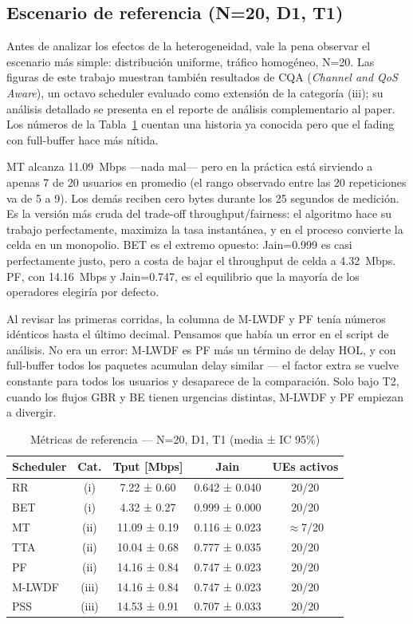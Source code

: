 \documentclass[conference]{IEEEtran}
\begin{document}
\subsection{Escenario de referencia (N=20, D1, T1)}

Antes de analizar los efectos de la heterogeneidad, vale la pena observar el escenario
más simple: distribución uniforme, tráfico homogéneo, N=20. Las figuras de este trabajo
muestran también resultados de CQA (\emph{Channel and QoS Aware}), un octavo scheduler
evaluado como extensión de la categoría (iii); su análisis detallado se presenta en el
reporte de análisis complementario al paper. Los números de la
Tabla~\ref{tab:referencia} cuentan una historia ya conocida pero que el fading con
full-buffer hace más nítida.

MT alcanza 11.09~Mbps ---nada mal--- pero en la práctica está sirviendo a apenas
7 de 20 usuarios en promedio (el rango observado entre las 20 repeticiones va de 5 a 9).
Los demás reciben cero bytes durante los 25 segundos de medición. Es la versión más cruda del trade-off throughput/fairness: el algoritmo
hace su trabajo perfectamente, maximiza la tasa instantánea, y en el proceso convierte
la celda en un monopolio. BET es el extremo opuesto: Jain=0.999 es casi perfectamente
justo, pero a costa de bajar el throughput de celda a 4.32~Mbps. PF, con 14.16~Mbps
y Jain=0.747, es el equilibrio que la mayoría de los operadores elegiría por defecto.

Al revisar las primeras corridas, la columna de M-LWDF y PF tenía números idénticos
hasta el último decimal. Pensamos que había un error en el script de análisis.
No era un error: M-LWDF es PF más un término de delay HOL, y con full-buffer todos
los paquetes acumulan delay similar --- el factor extra se vuelve constante para
todos los usuarios y desaparece de la comparación. Solo bajo T2, cuando los flujos
GBR y BE tienen urgencias distintas, M-LWDF y PF empiezan a divergir.

\begin{table}[t]
  \centering
  \caption{Métricas de referencia --- N=20, D1, T1 (media ± IC 95\%)}
  \label{tab:referencia}
  \footnotesize
  \begin{tabular}{@{}lcccc@{}}
    \toprule
    \textbf{Scheduler} & \textbf{Cat.} & \textbf{Tput [Mbps]} & \textbf{Jain} & \textbf{UEs activos} \\
    \midrule
    RR     & (i)   & 7.22 ± 0.60   & 0.642 ± 0.040 & 20/20 \\
    BET    & (i)   & 4.32 ± 0.27   & 0.999 ± 0.000 & 20/20 \\
    MT     & (ii)  & 11.09 ± 0.19  & 0.116 ± 0.023 & $\approx$7/20 \\
    TTA    & (ii)  & 10.04 ± 0.68  & 0.777 ± 0.035 & 20/20 \\
    PF     & (ii)  & 14.16 ± 0.84  & 0.747 ± 0.023 & 20/20 \\
    M-LWDF & (iii) & 14.16 ± 0.84  & 0.747 ± 0.023 & 20/20 \\
    PSS    & (iii) & 14.53 ± 0.91  & 0.707 ± 0.033 & 20/20 \\
    \bottomrule
  \end{tabular}
\end{table}
\end{document}
